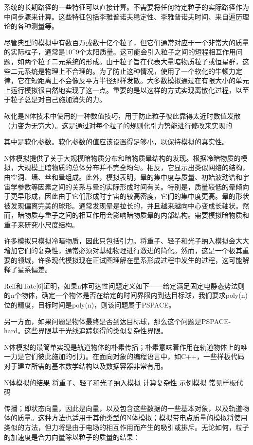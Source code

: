 系统的长期路径的一些特征可以直接计算。不需要将任何特定粒子的实际路径作为中间步骤来计算。这些特征包括李雅普诺夫稳定性、李雅普诺夫时间、来自遍历理论的各种测量等。

尽管典型的模拟中有数百万或数十亿个粒子，但它们通常对应于一个非常大的质量的实际粒子，通常是10^9个太阳质量。这可能会引入粒子之间的短程相互作用问题，如两个粒子二元系统的形成。由于粒子旨在代表大量暗物质粒子或恒星群，这些二元系统是物理上不合理的。为了防止这种情况，使用了一个软化的牛顿力定律，它在短距离上不会像反平方半径那样发散。大多数模拟通过在有限大小的单元上运行模拟很自然地实现了这一点。重要的是以这样的方式实现离散化过程，以至于粒子总是对自己施加消失的力。

软化是N体技术中使用的一种数值技巧，用于防止粒子彼此靠得太近时数值发散（力变为无穷大）。这是通过对每个粒子的规则化引力势能进行修改来实现的

其中是软化参数。软化参数的值应该设置得足够小，以保持模拟的真实性。

N体模拟提供了关于大规模暗物质分布和暗物质晕结构的发现。根据冷暗物质的模拟，大规模上暗物质的总体分布并不完全均匀。相反，它显示出类似网络的结构，由空洞、墙、丝和晕组成。此外，模拟表明，晕的集中度与质量、初始波动谱和宇宙学参数等因素之间的关系与晕的实际形成时间有关。特别是，质量较低的晕倾向于更早形成，因此由于它们形成时宇宙的较高密度，它们的集中度更高。晕的形状被发现偏离完美的球形。通常发现晕是拉长的，并且越来越向中心变成长轴状。然而，暗物质与重子之间的相互作用会影响暗物质晕的内部结构。需要模拟暗物质和重子来研究小尺度结构。

许多模拟只模拟冷暗物质，因此只包括引力。将重子、轻子和光子纳入模拟会大大增加它们的复杂性，通常必须对基础物理进行激进的简化。然而，这是一个极其重要的领域，许多现代模拟现在正试图理解在星系形成过程中发生的过程，这可能解释了星系偏差。

Reif和Tate[6]证明，如果n体可达性问题定义如下——给定满足固定电静态势法则的n个物体，确定一个物体是否在给定的时间界限内到达目标球，我们要求poly(n)位的精度，目标时间是poly(n)，则该问题属于PSPACE。

另一方面，如果问题是物体最终是否到达目标球，那么这个问题是PSPACE-hard。这些界限基于光线追踪获得的类似复杂性界限。

N体模拟的最简单实现是轨道物体的朴素传播；朴素意味着作用在轨道物体上的唯一力是它们彼此施加的引力。在面向对象的编程语言中，如C++，一些样板代码对于建立所需的基本数学结构以及数据容器非常有用。

N体模拟的结果
将重子、轻子和光子纳入模拟
计算复杂性
示例模拟
常见样板代码

传播；即状态向量，因此是向量，以及包含这些数据的一些基本对象，以及轨道物体的质量。这种方法也适用于其他类型的N体模拟；模拟带电点质量的模拟将使用类似的方法，但力将是由于电场的相互作用而产生的吸引或排斥。无论如何，粒子的加速度是合力向量除以粒子的质量的结果：

